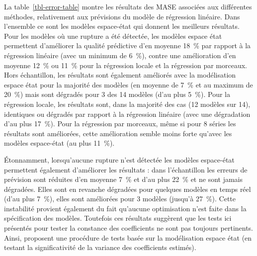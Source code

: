 \documentclass[
  a4paper,
  DIV=11,
  numbers=noendperiod,
  french]{scrartcl}
\newcommand\1{{\mathds 1}}
\theoremstyle{remark}
\begin{document}
La table~\ref{tbl-error-table} montre les résultats des MASE associées
aux différentes méthodes, relativement aux prévisions du modèle de
régression linéaire. Dans l'ensemble ce sont les modèles espace-état qui
donnent les meilleurs résultats. Pour les modèles où une rupture a été
détectée, les modèles espace état permettent d'améliorer la qualité
prédictive d'en moyenne 18~\% par rapport à la régression linéaire (avec
un minimum de 6~\%), contre une amélioration d'en moyenne 12~\% ou 11~\%
pour la régression locale et la régression par morceaux. Hors
échantillon, les résultats sont également améliorés avec la modélisation
espace état pour la majorité des modèles (en moyenne de 7~\% et au
maximum de 20~\%) mais sont dégradés pour 3 des 14 modèles (d'au plus
5~\%). Pour la régression locale, les résultats sont, dans la majorité
des cas (12 modèles sur 14), identiques ou dégradés par rapport à la
régression linéaire (avec une dégradation d'au plus 17~\%). Pour la
régression par morceaux, même si pour 8 séries les résultats sont
améliorées, cette amélioration semble moins forte qu'avec les modèles
espace-état (au plus 11~\%).

Étonnamment, lorsqu'aucune rupture n'est détectée les modèles
espace-état permettent également d'améliorer les résultats : dans
l'échantillon les erreurs de prévision sont réduites d'en moyenne 7~\%
et d'au plus 22~\% et ne sont jamais dégradées. Elles sont en revanche
dégradées pour quelques modèles en temps réel (d'au plus 7~\%), elles
sont améliorées pour 3 modèles (jusqu'à 27~\%). Cette instabilité
provient également du fait qu'aucune optimisation n'est faite dans la
spécification des modèles. Toutefois ces résultats suggèrent que les
tests ici présentés pour tester la constance des coefficients ne sont
pas toujours pertinents. Ainsi, \textcite{abs2006} proposent une
procédure de tests basée sur la modélisation espace état (en testant la
significativité de la variance des coefficients estimés).
\end{document}
